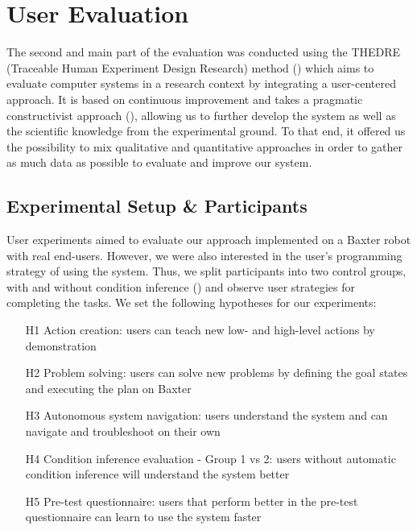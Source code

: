 
\section{User Evaluation}
\label{sec:quanteval}
The second and main part of the evaluation was conducted using the THEDRE (Traceable Human Experiment Design Research) method (\cite{mandran2018traceable,mandran2017thedre}) which aims to evaluate computer systems in a research context by integrating a user-centered approach.
It is based on continuous improvement and takes a pragmatic constructivist approach (\cite{avenier2015finding}), allowing us to further develop the system as well as the scientific knowledge from the experimental ground.
To that end, it offered us the possibility to mix qualitative and quantitative approaches in order to gather as much data as possible to evaluate and improve our system. 

\subsection{Experimental Setup \& Participants}
User experiments aimed to evaluate our approach implemented on a Baxter robot with real end-users.
However, we were also interested in the user's programming strategy of using the system.
Thus, we split participants into two control groups, with and without condition inference () and observe user strategies for completing the tasks.
We set the following hypotheses for our experiments:
\begin{enumerate}
    \item[H1] Action creation: users can teach new low- and high-level actions by demonstration
    \item[H2] Problem solving: users can solve new problems by defining the goal states and executing the plan on Baxter
    \item[H3] Autonomous system navigation: users understand the system and can navigate and troubleshoot on their own
    \item[H4] Condition inference evaluation - Group 1 vs 2: users without automatic condition inference will understand the system better
    \item[H5] Pre-test questionnaire: users that perform better in the pre-test questionnaire can learn to use the system faster
\end{enumerate}

